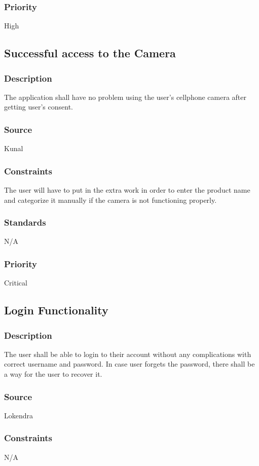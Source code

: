 \subsubsection{Priority}
High

\subsection{Successful access to the Camera}
\subsubsection{Description}
The application shall have no problem using the user's cellphone camera after getting user's consent.
\subsubsection{Source}
Kunal
\subsubsection{Constraints}
The user will have to put in the extra work in order to enter the product name and categorize it manually if the camera is not functioning properly.
\subsubsection{Standards}
N/A
\subsubsection{Priority}
Critical

\subsection{Login Functionality}
\subsubsection{Description}
The user shall be able to login to their account without any complications with correct username and password. In case user forgets the password, there shall be a way for the user to recover it.
\subsubsection{Source}
Lokendra
\subsubsection{Constraints}
N/A
